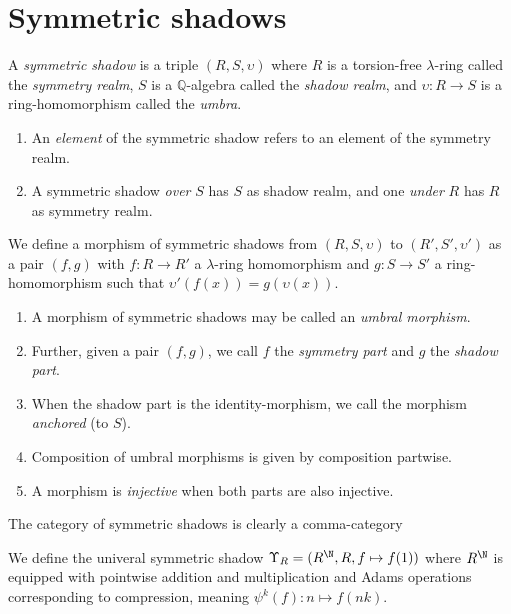 
\section{Symmetric shadows}

\begin{definition}
  A \emph{symmetric shadow} is a triple $(R, S, \upsilon)$ where $R$ is a torsion-free $\lambda$-ring called the \emph{symmetry realm}, $S$ is a $\mathbb{Q}$-algebra called the \emph{shadow realm}, and $\upsilon: R \to S$ is a ring-homomorphism called the \emph{umbra}. 
  \begin{enumerate}
    \item An \emph{element} of the symmetric shadow refers to an element of the symmetry realm. 
    \item A symmetric shadow \emph{over} $S$ has $S$ as shadow realm, and one \emph{under} $R$ has $R$ as symmetry realm.
  \end{enumerate}
\end{definition}

\begin{definition}
  We define a morphism of symmetric shadows from $(R, S, \upsilon)$ to $(R', S', \upsilon')$ as a pair $(f, g)$ with $f : R \to R'$ a $\lambda$-ring homomorphism and $g : S \to S'$ a ring-homomorphism such that $\upsilon'(f(x)) = g(\upsilon(x))$. 
  \begin{enumerate}
    \item A morphism of symmetric shadows may be called an \emph{umbral morphism}. 
    \item Further, given a pair $(f, g)$, we call $f$ the \emph{symmetry part} and $g$ the \emph{shadow part}. 
    \item When the shadow part is the identity-morphism, we call the morphism \emph{anchored} (to $S$). 
    \item Composition of umbral morphisms is given by composition partwise. 
    \item A morphism is \emph{injective} when both parts are also injective. 
  \end{enumerate}
\end{definition}

\begin{remark}
  The category of symmetric shadows is clearly a comma-category
\end{remark}

\begin{definition}
  We define the univeral symmetric shadow $\Upsilon_R = (R^{\N}, R, f \mapsto f(1))$ where $R^{\N}$ is equipped with pointwise addition and multiplication and Adams operations corresponding to compression, meaning $\psi^k(f) : n \mapsto f(nk)$.
\end{definition}

